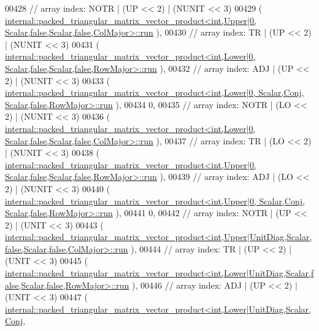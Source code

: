 \begin{DoxyCode}
00428     \textcolor{comment}{// array index: NOTR  | (UP << 2) | (NUNIT << 3)}
00429     (
      \hyperlink{structinternal_1_1packed__triangular__matrix__vector__product}{internal::packed\_triangular\_matrix\_vector\_product<int,Upper|0,      
       Scalar,false,Scalar,false,ColMajor>::run}
      ),
00430     \textcolor{comment}{// array index: TR    | (UP << 2) | (NUNIT << 3)}
00431     (
      \hyperlink{structinternal_1_1packed__triangular__matrix__vector__product}{internal::packed\_triangular\_matrix\_vector\_product<int,Lower|0,      
       Scalar,false,Scalar,false,RowMajor>::run}
      ),
00432     \textcolor{comment}{// array index: ADJ   | (UP << 2) | (NUNIT << 3)}
00433     (
      \hyperlink{structinternal_1_1packed__triangular__matrix__vector__product}{internal::packed\_triangular\_matrix\_vector\_product<int,Lower|0,       Scalar,Conj,
       Scalar,false,RowMajor>::run}
      ),
00434     0,
00435     \textcolor{comment}{// array index: NOTR  | (LO << 2) | (NUNIT << 3)}
00436     (
      \hyperlink{structinternal_1_1packed__triangular__matrix__vector__product}{internal::packed\_triangular\_matrix\_vector\_product<int,Lower|0,      
       Scalar,false,Scalar,false,ColMajor>::run}
      ),
00437     \textcolor{comment}{// array index: TR    | (LO << 2) | (NUNIT << 3)}
00438     (
      \hyperlink{structinternal_1_1packed__triangular__matrix__vector__product}{internal::packed\_triangular\_matrix\_vector\_product<int,Upper|0,      
       Scalar,false,Scalar,false,RowMajor>::run}
      ),
00439     \textcolor{comment}{// array index: ADJ   | (LO << 2) | (NUNIT << 3)}
00440     (
      \hyperlink{structinternal_1_1packed__triangular__matrix__vector__product}{internal::packed\_triangular\_matrix\_vector\_product<int,Upper|0,       Scalar,Conj,
       Scalar,false,RowMajor>::run}
      ),
00441     0,
00442     \textcolor{comment}{// array index: NOTR  | (UP << 2) | (UNIT  << 3)}
00443     (
      \hyperlink{structinternal_1_1packed__triangular__matrix__vector__product}{
      internal::packed\_triangular\_matrix\_vector\_product<int,Upper|UnitDiag,Scalar,false,Scalar,false,ColMajor>::run}
      ),
00444     \textcolor{comment}{// array index: TR    | (UP << 2) | (UNIT  << 3)}
00445     (
      \hyperlink{structinternal_1_1packed__triangular__matrix__vector__product}{
      internal::packed\_triangular\_matrix\_vector\_product<int,Lower|UnitDiag,Scalar,false,Scalar,false,RowMajor>::run}
      ),
00446     \textcolor{comment}{// array index: ADJ   | (UP << 2) | (UNIT  << 3)}
00447     (
      \hyperlink{structinternal_1_1packed__triangular__matrix__vector__product}{internal::packed\_triangular\_matrix\_vector\_product<int,Lower|UnitDiag,Scalar,Conj,
}
\end{DoxyCode}

